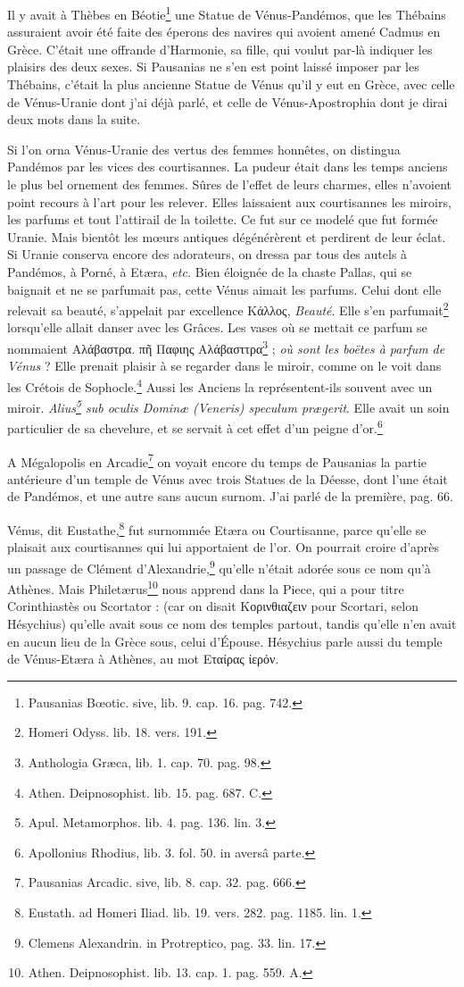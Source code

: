 \documentclass[a4paper, 18pt, oneside]{article}
\begin{document}
Il y avait à Thèbes en Béotie\footnote{Pausanias Bœotic. sive, lib. 9. cap. 16. pag. 742.} une Statue de Vénus-Pandémos, que les Thébains assuraient avoir été faite des éperons des navires qui avoient amené Cadmus en Grèce. C'était une offrande d'Harmonie, sa fille, qui voulut par-là indiquer les plaisirs des deux sexes. Si Pausanias ne s'en est point laissé imposer par les Thébains, c'était la plus ancienne Statue de Vénus qu'il y eut en Grèce, avec celle de Vénus-Uranie dont j'ai déjà parlé, et celle de Vénus-Apostrophia dont je dirai deux mots dans la suite.

Si l'on orna Vénus-Uranie des vertus des femmes honnêtes, on distingua Pandémos par les vices des courtisannes. La pudeur était dans les temps anciens le plus bel ornement des femmes. Sûres de l'effet de leurs charmes, elles n'avoient point recours à l'art pour les relever. Elles laissaient aux courtisannes les miroirs, les parfums et tout l'attirail de la toilette. Ce fut sur ce modelé que fut formée Uranie. Mais bientôt les mœurs antiques dégénérèrent et perdirent de leur éclat. Si Uranie conserva encore des adorateurs, on dressa par tous des autels à Pandémos, à Porné, à Etæra, \emph{etc.} Bien éloignée de la chaste Pallas, qui se baignait et ne se parfumait pas, cette Vénus aimait les parfums. Celui dont elle relevait sa beauté, s'appelait par excellence Κάλλος, \emph{Beauté}. Elle s'en parfumait\footnote{Homeri Odyss. lib. 18. vers. 191.} lorsqu'elle allait danser avec les Grâces. Les vases où se mettait ce parfum se nommaient Αλάβαστρα. πῆ Παφιης Αλάβασττρα\footnote{Anthologia Græca, lib. 1. cap. 70. pag. 98.} ; \emph{où sont les boëtes à parfum de Vénus} ? Elle prenait plaisir à se regarder dans le miroir, comme on le voit dans les Crétois de Sophocle.\footnote{Athen. Deipnosophist. lib. 15. pag. 687. C.} Aussi les Anciens la représentent-ils souvent avec un miroir. \emph{Alius\footnote{Apul. Metamorphos. lib. 4. pag. 136. lin. 3.} sub oculis Dominæ (Veneris) speculum prægerit}. Elle avait un soin particulier de sa chevelure, et se servait à cet effet d'un peigne d'or.\footnote{Apollonius Rhodius, lib. 3. fol. 50. in aversâ parte.}

A Mégalopolis en Arcadie\footnote{Pausanias Arcadic. sive, lib. 8. cap. 32. pag. 666.} on voyait encore du temps de Pausanias la partie antérieure d'un temple de Vénus avec trois Statues de la Déesse, dont l'une était de Pandémos, et une autre sans aucun surnom. J'ai parlé de la première, pag. 66.

Vénus, dit Eustathe,\footnote{Eustath. ad Homeri Iliad. lib. 19. vers. 282. pag. 1185. lin. 1.} fut surnommée Etæra ou Courtisanne, parce qu'elle se plaisait aux courtisannes qui lui apportaient de l'or. On pourrait croire d'après un passage de Clément d'Alexandrie,\footnote{Clemens Alexandrin. in Protreptico, pag. 33. lin. 17.} qu'elle n'était adorée sous ce nom qu'à Athènes. Mais Philetærus\footnote{Athen. Deipnosophist. lib. 13. cap. 1. pag. 559. A.} nous apprend dans la Piece, qui a pour titre Corinthiastès ou Scortator : (car on disait Κορινθιαζειν pour Scortari, selon Hésychius) qu'elle avait sous ce nom des temples partout, tandis qu'elle n'en avait en aucun lieu de la Grèce sous, celui d'Épouse. Hésychius parle aussi du temple de Vénus-Etæra à Athènes, au mot Εταίρας ίερόν.
\end{document}
